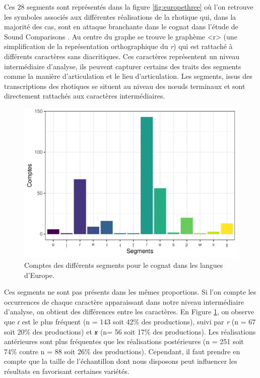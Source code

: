 Ces 28 segments sont représentés dans la figure \ref{fig:europethree} où l'on retrouve les symboles associés aux différentes réalisations de la rhotique qui, dans la majorité des cas, sont en attaque branchante dans le cognat  dans l'étude de Sound Comparisons . Au centre du graphe se trouve le graphème <r> (une simplification de la représentation orthographique du \textit{r}) qui est rattaché à différents caractères sans diacritiques. Ces caractères  représentent un niveau intermédiaire d'analyse, ils peuvent capturer certains des traits des segments comme la manière d'articulation et le lieu d'articulation. Les segments, issus des transcriptions des rhotiques se situent au niveau des nœuds terminaux et sont directement rattachés aux caractères intermédiaires.\\

\begin{figure}
	\centering
	\includegraphics[width=1\linewidth]{substance/images/counts_1_europe}
	\caption[Comptes des différents segments pour le cognat  dans les langues d'Europe]{Comptes des différents segments pour le cognat  dans les langues d'Europe.}
	\label{fig:counts1europe}
\end{figure}

Ces segments ne sont pas présents dans les mêmes proportions. Si l'on compte les occurrences de chaque caractère apparaissant dans notre niveau intermédiaire d'analyse, on obtient des différences entre les caractères. En Figure \ref{fig:counts1europe}, on observe que \textit{ɾ} est le plus fréquent (n = 143 soit 42\% des productions), suivi par \textit{r} (n = 67 soit 20\% des productions) et \textit{ʁ} (n= 56 soit 17\% des productions). Les réalisations antérieures sont plus fréquentes que les réalisations postérieures (n = 251 soit 74\% contre n = 88 soit 26\% des productions). Cependant, il faut prendre en compte que la taille de l'échantillon dont nous disposons peut influencer les résultats en favorisant certaines variétés.\\

